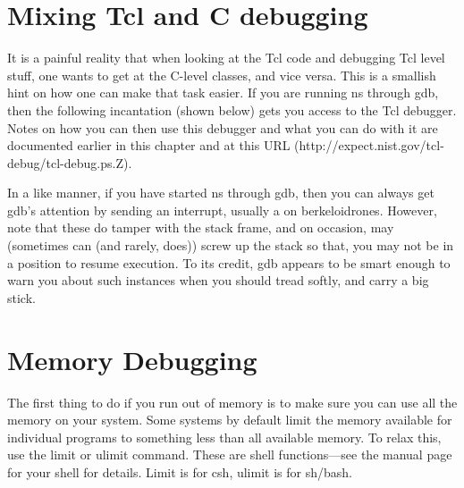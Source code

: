 \section{Mixing Tcl and C debugging}
\label{sec:mixdebug}

It is a painful reality that when looking at the Tcl code and debugging
Tcl level stuff, one wants to get at the C-level classes, and vice versa.
This is a smallish hint on how one can make that task easier. If you are
running ns through gdb, then the following incantation (shown below) gets
you access to the Tcl 
debugger. Notes on how you can then use this debugger and what you can do
with it are documented earlier in this chapter and at this URL
(http://expect.nist.gov/tcl-debug/tcl-debug.ps.Z).

In a like manner, if you have started ns through gdb, then you can always
get gdb's attention by sending an interrupt, usually a 
on
berkeloidrones. However, note that these do tamper with the stack frame, and on occasion,
may (sometimes can (and rarely, does)) screw up the stack so that, you may
not be in a position to resume execution. To its credit, gdb appears to be
smart enough to warn you about such instances when you should tread
softly, and carry a big stick. 


\section{Memory Debugging}
\label{sec:memdebug}

The first thing to do if you run out of memory is to make sure you can use
all the memory on your system. Some systems by default limit the memory
available for individual programs to something less than all available
memory. To relax this, use the limit or ulimit command. These are shell
functions---see the manual page for your shell for details. Limit is for
csh, ulimit is for sh/bash. 

